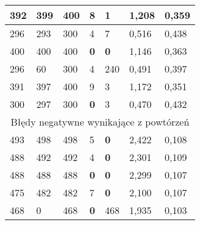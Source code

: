 \documentclass[a4paper]{article}
\begin{document}
\begin{table}[H]
\begin{tabular}{|p{1.6cm}|p{1.6cm}|p{1.6cm}|p{1.6cm}|p{1.6cm}|p{1.6cm}|p{1.6cm}|}
392 & 399 & 400 & 8 & 1 & 1,208 & 0,359 \\ \hline
296 & 293 & 300 & 4 & 7 & 0,516 & 0,438 \\ \hline
400 & 400 & 400 & \textbf{0} & \textbf{0} & 1,146 & 0,363 \\ \hline
296 & 60 & 300 & 4 & 240 & 0,491 & 0,397 \\ \hline
391 & 397 & 400 & 9 & 3 & 1,172 & 0,351 \\ \hline
300 & 297 & 300 & \textbf{0} & 3 & 0,470 & 0,432 \\ \hline
\multicolumn{7}{|c|}{Błędy negatywne wynikające z powtórzeń} \\ \hline
493 & 498 & 498 & 5 & \textbf{0} & 2,422 & 0,108 \\ \hline
488 & 492 & 492 & 4 & \textbf{0} & 2,301 & 0,109 \\ \hline
488 & 488 & 488 & \textbf{0} & \textbf{0} & 2,299 & 0,107 \\ \hline
475 & 482 & 482 & 7 & \textbf{0} & 2,100 & 0,107 \\ \hline
468 & 0 & 468 & \textbf{0} & 468 & 1,935 & 0,103 \\ \hline
\end{tabular}
\label{}
\end{table}
\end{document}
